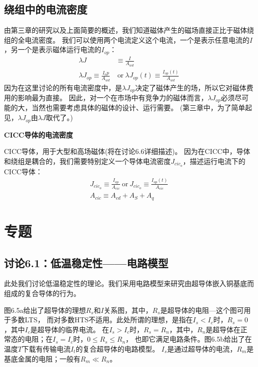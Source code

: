 \subsection{绕组中的电流密度}
由第三章的研究以及上面简要的概述，我们知道磁体产生的磁场直接正比于磁体绕组的全电流密度。
我们可以使用两个电流定义这个电流，一个是表示任意电流的$I$，另一个是表示磁体运行电流的$I_{op}$：
\begin{subequations}
	\begin{align}
	\lambda J&\equiv\frac{I}{A_{wd}}\\
	\lambda J_{op}\equiv\frac{I_op}{A_{wd}}&  \ \mbox{or}\  \lambda J_{op}(t)\equiv\frac{I_{op}(t)}{A_{wd}}
	\end{align}
\end{subequations}
因为在这里讨论的所有电流密度中，是$\lambda J_{op}$决定了磁体产生的场，所以它对磁体费用的影响最为直接。
因此，对一个在市场中有竞争力的磁体而言，$\lambda J_{op}$必须尽可能的大，当然也需要考虑具体的磁体的设计、运行需要。
(第三章中，为了简单起见，$\lambda J_{op}$由$\lambda J$取代了。)

\textbf{CICC导体的电流密度}

CICC导体，用于大型和高场磁体(将在讨论6.6详细描述)。
因为在CICC中，导体和绕组是耦合的，我们需要特别定义一个导体电流密度$J_{cic_o}$，描述运行电流下的CICC导体：
\begin{subequations}
	\begin{align}
	J_{cic_o}\equiv\frac{I_{op}}{A_{cic}}\ \mbox{or}\ J_{cic_o}\equiv\frac{I_{op}(t)}{A_{cic}}\\
	A_{cic}\equiv A_{cd}+A_S+A_q
	\end{align}
\end{subequations}


\section{专题}
\subsection{讨论6.1：低温稳定性——电路模型}
此处我们讨论低温稳定性的理论。我们采用电路模型来研究由超导体嵌入铜基底而组成的复合导体的行为。

图6.5a给出了超导体的理想$R_s$和$I$关系图，其中，$R_s$是超导体的电阻---这个图可用于多数LTS，
而对多数HTS不适用。此处所谓的理想，是指在$I_s<I_c$时，$R_s=0$，其中$I_c$是超导体的临界电流。
在$I_s>I_c$时，$R_s=R_n$，其中，$R_n$是超导体在正常态的电阻；在$I_s=I_c$时，$0\le R_s\le 	R_n$，
也即它满足电路条件。图6.5b给出了在温度$T$下载有传输电流$I_t$的复合超导体的电路模型。
$I_s$是通过超导体的电流，$R_m$是基底金属的电阻；一般有$R_m\ll R_n$。

